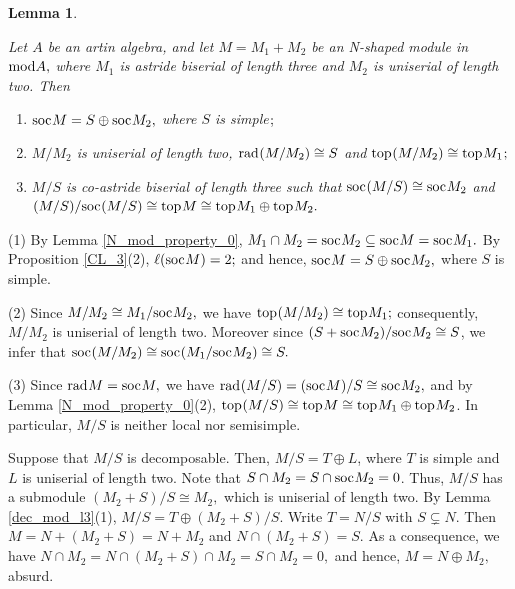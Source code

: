 \documentclass[10pt]{amsart}
\newtheorem{Lemma}[Theo]{Lemma}
\theoremstyle{definition}
\newcommand{\mmod}{{\rm mod}}
\newcommand{\rad}{{\rm rad}\hspace{.5pt}}
\newcommand{\soc}{{\rm soc}\hspace{.5pt}}
\newcommand{\ntop}{{\rm top}\hspace{.5pt}}
\newcommand{\hp}{\hspace{.5pt}}
\begin{document}
\vspace{2pt}


\begin{Lemma}\label{N_mod_property}

Let $A$ be an artin algebra, and let $M=M_1+M_2$ be an N-shaped module in $\mmod A,$ where $M_1$ is astride biserial of length three and $M_2$ is uniserial of length two. Then 

\begin{enumerate}[$(1)$]

\vspace{-2pt}

\item $\soc M = S \oplus \soc M_2,$ where $S$ is simple$\hp;$

\item $M/M_2$ is uniserial of length two, $\rad(M/M_2) \cong S$ and $\ntop(M/M_2) \cong \ntop M_1\hp;$

\item $M/S$ is co-astride biserial of length three such that $\soc(M/S)  \cong   \soc M_2$ and $(M/S)/\soc(M/S)  \cong \ntop M\cong \ntop M_1\oplus \ntop M_2.$ 

\end{enumerate} \end{Lemma}

\vspace{-1.5pt}

 (1) By Lemma \ref{N_mod_property_0}, $M_1\cap M_2=\soc M_2\subseteq \soc M=\soc M_1.$ By Proposition \ref{CL_3}(2), $\ell(\soc M)=2;$ and hence, $\soc M=S  \oplus  \soc M_2,$ where $S$ is simple. 

(2) Since $M/M_2\cong M_1/\soc M_2,$ we have $\ntop(M/M_2) \cong \ntop M_1;$ consequently, $M/M_2$ is uniserial of length two. Moreover since $(S+\soc M_2)/\soc M_2\cong S$, we infer that $\soc(M/M_2)\cong \soc(M_1/\soc M_2) \cong S.$

(3) Since $\rad M=\soc M,$ we have $\rad (M/S)=(\soc M)/S\cong \soc M_2,$ and by Lemma \ref{N_mod_property_0}(2), $\ntop(M/S)\cong \ntop M\cong \ntop M_1\oplus \ntop M_2$.  
In particular, $M/S$ is neither local nor semisimple. 

Suppose that $M/S$ is decomposable. Then, $M/S=T\oplus L$, where $T$ is simple and $L$ is uniserial of length two. Note that $S\cap M_2=S\cap \soc M_2=0$. Thus, $M/S$ has a submodule $(M_2+S)/S \cong M_2,$ which is uniserial of length two. By Lemma \ref{dec_mod_l3}(1), $M/S=T\oplus (M_2+S)/S$. Write $T=N/S$ with $S\subsetneq N.$ Then $M=N+(M_2+S)=N+M_2$ and $N\cap (M_2+S)=S.$ As a consequence, we have $N\cap M_2=N\cap (M_2+S)\cap M_2=S\cap M_2=0,$ and hence, $M=N\oplus M_2,$ absurd. 
\end{document}
